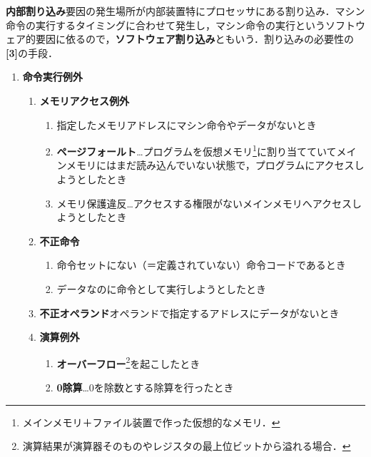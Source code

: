 \begin{enumerate}[label=\textbf{[\Alph*]}, labelsep=10pt, leftmargin=23pt]
	\item \textbf{内部割り込み}\quad 要因の発生場所が内部装置特にプロセッサにある割り込み．マシン命令の実行するタイミングに合わせて発生し，マシン命令の実行というソフトウェア的要因に依るので，\textbf{ソフトウェア割り込み}ともいう．割り込みの必要性の\textbf{[3]}の手段．
		\begin{enumerate}[label=\textbf{(\arabic*)}, labelsep=10pt, leftmargin=23pt]
			\item \textbf{命令実行例外}
				\begin{enumerate}[label={\color{gray}●}, labelsep=10pt, leftmargin=23pt]
					\item \textbf{メモリアクセス例外}
						\begin{enumerate}[label=\textbf{(\roman*)}, labelsep=10pt, leftmargin=23pt]
							\item 指定したメモリアドレスにマシン命令やデータがないとき
							\item \textbf{ページフォールト}…プログラムを仮想メモリ\footnote{メインメモリ＋ファイル装置で作った仮想的なメモリ．}に割り当てていてメインメモリにはまだ読み込んでいない状態で，プログラムにアクセスしようとしたとき
							\item メモリ保護違反…アクセスする権限がないメインメモリへアクセスしようとしたとき
						\end{enumerate}
					\item \textbf{不正命令}
						\begin{enumerate}[label=\textbf{(\roman*)}, labelsep=10pt, leftmargin=23pt]
							\item 命令セットにない（＝定義されていない）命令コードであるとき
							\item データなのに命令として実行しようとしたとき
						\end{enumerate}
					\item \textbf{不正オペランド}\quad オペランドで指定するアドレスにデータがないとき
					\item \textbf{演算例外}
						\begin{enumerate}[label=\textbf{(\roman*)}, labelsep=10pt, leftmargin=23pt]
							\item \textbf{オーバーフロー}\footnote{演算結果が演算器そのものやレジスタの最上位ビットから溢れる場合．}を起こしたとき
							\item \textbf{0除算}…0を除数とする除算を行ったとき
						\end{enumerate}
				\end{enumerate}

\end{enumerate}
\end{enumerate}

